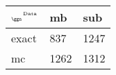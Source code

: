 \begin{tabular}{lll}
    \toprule
    $_{\text{\tiny{\ggn}}}$$^{\text{\tiny{Data}}}$ & mb & sub \\
    \midrule
    exact & 837
              & 1247 \\
    mc   & 1262
              & 1312 \\
    \bottomrule
\end{tabular}